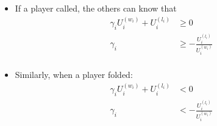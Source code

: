 \documentclass[10pt]{beamer}
\begin{document}
\begin{frame}
\begin{columns}
  \begin{column}{7cm}
    \begin{itemize}[label=$\clubsuit$	]
     \item If a player called, the others can know that
     \begin{align*}
\gamma_i U^{(w_i)}_i + U^{(l_i)}_i &\geq 0\\
\gamma_i &\geq -\frac{U^{(l_i)}_i }{U^{(w_i)}_i}\\
\end{align*}
    \item Similarly, when a player folded:
    \begin{align*}
\gamma_i U^{(w_i)}_i + U^{(l_i)}_i &< 0\\
\gamma_i &< -\frac{U^{(l_i)}_i }{U^{(w_i)}_i}\\
\end{align*}

    \end{itemize}
  \end{column}
 \end{columns}
\end{frame}
\end{document}
